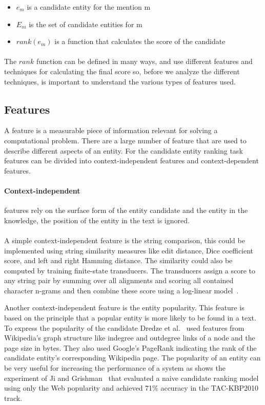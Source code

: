 \begin{itemize}[noitemsep,  topsep=10pt]
\item $e_m$ is a candidate entity for the mention m
\item $E_m$ is the set of candidate entities for m
\item $rank(e_m)$ is a function that calculates the score of the candidate
\end{itemize}

\paragraph{}
The $rank$ function can be defined in many ways, and use different features and techniques for calculating the final score so, before we analyze the different techniques, is important to understand the various types of features used.

\subsection{Features}
A feature is a measurable piece of information relevant for solving a computational problem. There are a large number of feature that are used to describe different aspects of an entity. For the candidate entity ranking task features can be divided into context-independent features and context-dependent features.


\paragraph{Context-independent} features rely on the surface form of the entity candidate and the entity in the knowledge, the position of the entity in the text is ignored. 

\paragraph{} 
A simple context-independent feature is the string comparison, this could be implemented using string similarity measures like edit distance, Dice coefficient score, and left and right Hamming distance. The similarity could also be computed by training finite-state transducers. The transducers assign a score to any string pair by summing over all alignments and scoring all contained character n-grams and then combine these score using a log-linear model~\cite{dredze2010entity}.

Another context-independent feature is the entity popularity. This feature is based on the principle that a popular entity is more likely to be found in a text. To express the popularity of the candidate Dredze et al.~\cite{dredze2010entity} used features from Wikipedia's graph structure like indegree and outdegree links of a node and the page size in bytes. They also used Google's PageRank indicating the rank of the candidate entity's corresponding Wikipedia page. The popularity of an entity can be very useful for increasing the performance of a system as shows the experiment of Ji and Grishman~\cite{ji2011knowledge} that evaluated a naive candidate ranking model using only the Web popularity and achieved 71\% accuracy in the TAC-KBP2010 track.

